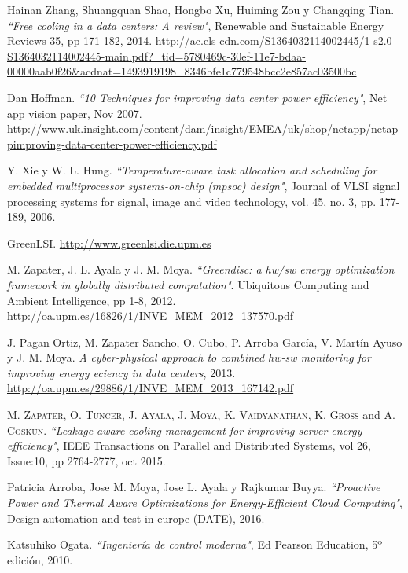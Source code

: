 \begin{thebibliography}{x}
	 Hainan Zhang, Shuangquan Shao, Hongbo Xu, Huiming Zou y Changqing Tian. 
	\textit{``Free cooling in a data centers: A review"}, Renewable and Sustainable Energy Reviews 35, pp 171-182, 2014. \url{ http://ac.els-cdn.com/S1364032114002445/1-s2.0-S1364032114002445-main.pdf?_tid=5780469c-30ef-11e7-bdaa-00000aab0f26&acdnat=1493919198_8346bfe1c779548bcc2e857ac03500bc} 

	 Dan Hoffman.
		  \textit{``10 Techniques for improving data center power efficiency"}, Net app vision paper, Nov 2007. \url{http://www.uk.insight.com/content/dam/insight/EMEA/uk/shop/netapp/netappimproving-data-center-power-efficiency.pdf}

	 Y. Xie y W. L. Hung. 
		 \textit{``Temperature-aware task allocation and scheduling for embedded multiprocessor systems-on-chip (mpsoc) design"}, Journal of VLSI signal processing systems for signal, image and video technology, vol. 45, no. 3, pp. 177-189, 2006.

	 GreenLSI. \url{http://www.greenlsi.die.upm.es}

	 M. Zapater, J. L. Ayala y J. M. Moya. 
	           \textit{``Greendisc: a hw/sw energy optimization framework in globally distributed computation"}.  Ubiquitous Computing and Ambient Intelligence, pp 1-8, 2012. \url{http://oa.upm.es/16826/1/INVE_MEM_2012_137570.pdf}

	 J. Pagan Ortiz, M. Zapater Sancho, O. Cubo, P. Arroba García, V. Martín Ayuso y J. M. Moya. 
	     \textit{A cyber-physical approach to combined hw-sw monitoring for improving energy eciency in data centers},  2013. \url{http://oa.upm.es/29886/1/INVE_MEM_2013_167142.pdf}

	 \textsc{M. Zapater}, \textsc{O. Tuncer}, \textsc{J. Ayala}, \textsc{J. Moya}, \textsc{K. Vaidyanathan}, \textsc{K. Gross} and \textsc{A. Coskun}. 
	      \textit{``Leakage-aware cooling management for improving server energy efficiency"}, IEEE Transactions on Parallel and Distributed Systems, vol 26, Issue:10, pp 2764-2777, oct 2015. 

	 Patricia Arroba, Jose M. Moya, Jose L. Ayala y Rajkumar Buyya.
	       \textit{``Proactive Power and Thermal Aware Optimizations for Energy-Efficient Cloud Computing"},  Design automation and test in europe (DATE), 2016. 

	 Katsuhiko Ogata. \textit{``Ingeniería de control moderna"}, Ed Pearson Education, 5º edición, 2010.


\end{thebibliography}

